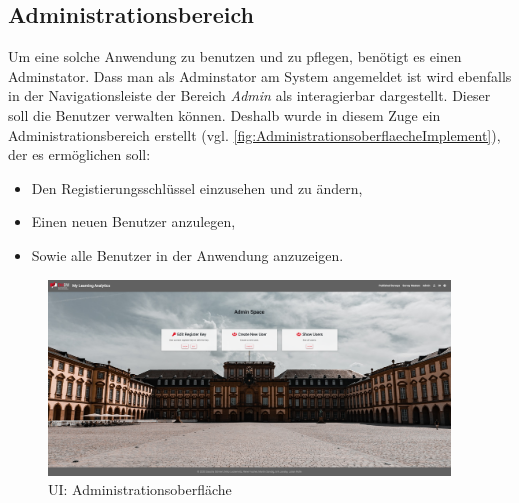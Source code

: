 
\subsection{Administrationsbereich}
\label{ssec:Administrationsbereich}

Um eine solche Anwendung zu benutzen und zu pflegen, benötigt es einen Adminstator.
Dass man als Adminstator am System angemeldet ist wird ebenfalls in der Navigationsleiste der Bereich \emph{Admin} als interagierbar dargestellt.
Dieser soll \ua die Benutzer verwalten können. 
Deshalb wurde in diesem Zuge ein Administrationsbereich erstellt (vgl. \vref{fig:AdministrationsoberflaecheImplement}), der es ermöglichen soll: 
%
\begin{itemize}
    \item Den Registierungsschlüssel einzusehen und zu ändern,
    \item Einen neuen Benutzer anzulegen,
    \item Sowie alle Benutzer in der Anwendung anzuzeigen. 
\end{itemize}
%
\begin{figure}[hp]
	\centering
	\includegraphics[width=0.95\textwidth, keepaspectratio]{img/client/Admin.png}
	\captionsetup{justification=centering, format=plain}
	\caption[\acf{UI}: Administrationsoberfläche]{\acf{UI}: Administrationsoberfläche \\ \quelleScreenshot}
	\label{fig:AdministrationsoberflaecheImplement}
\end{figure}
%






